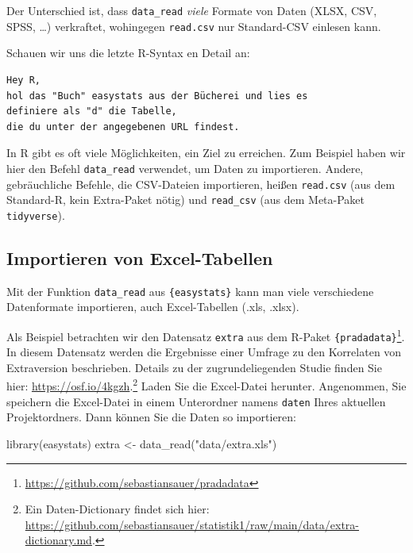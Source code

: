 \documentclass[
  letterpaper,
  oneside,
  open=any]{scrbook}
\newenvironment{Shaded}{\begin{snugshade}}{\end{snugshade}}
\newcommand{\FunctionTok}[1]{\textcolor[rgb]{0.28,0.35,0.67}{#1}}
\newcommand{\NormalTok}[1]{\textcolor[rgb]{0.00,0.23,0.31}{#1}}
\newcommand{\OtherTok}[1]{\textcolor[rgb]{0.00,0.23,0.31}{#1}}
\newcommand{\StringTok}[1]{\textcolor[rgb]{0.13,0.47,0.30}{#1}}
\theoremstyle{definition}
\theoremstyle{definition}
\theoremstyle{definition}
\theoremstyle{remark}
\begin{document}
Der Unterschied ist, dass \texttt{data\_read} \emph{viele} Formate von
Daten (XLSX, CSV, SPSS, \ldots) verkraftet, wohingegen \texttt{read.csv}
nur Standard-CSV einlesen kann.

Schauen wir uns die letzte R-Syntax en Detail an:

\begin{verbatim}
Hey R,
hol das "Buch" easystats aus der Bücherei und lies es
definiere als "d" die Tabelle,
die du unter der angegebenen URL findest.
\end{verbatim}

In R gibt es oft viele Möglichkeiten, ein Ziel zu erreichen. Zum
Beispiel haben wir hier den Befehl \texttt{data\_read} verwendet, um
Daten zu importieren. Andere, gebräuchliche Befehle, die CSV-Dateien
importieren, heißen \texttt{read.csv} (aus dem Standard-R, kein
Extra-Paket nötig) und \texttt{read\_csv} (aus dem Meta-Paket
\texttt{tidyverse}).

\subsection{Importieren von
Excel-Tabellen}\label{importieren-von-excel-tabellen}

Mit der Funktion \texttt{data\_read} aus \texttt{\{easystats\}} kann man
viele verschiedene Datenformate importieren, auch Excel-Tabellen (.xls,
.xlsx).

Als Beispiel betrachten wir den Datensatz \texttt{extra} aus dem R-Paket
\texttt{\{pradadata\}}\footnote{\url{https://github.com/sebastiansauer/pradadata}}.
In diesem Datensatz werden die Ergebnisse einer Umfrage zu den
Korrelaten von Extraversion beschrieben. Details zu der
zugrundeliegenden Studie finden Sie hier:
\url{https://osf.io/4kgzh}.\footnote{Ein Daten-Dictionary findet sich
  hier:
  \url{https://github.com/sebastiansauer/statistik1/raw/main/data/extra-dictionary.md}.}
Laden Sie die Excel-Datei herunter. Angenommen, Sie speichern die
Excel-Datei in einem Unterordner namens \texttt{daten} Ihres aktuellen
Projektordners. Dann können Sie die Daten so importieren:

\begin{Shaded}
\begin{Highlighting}[]
\FunctionTok{library}\NormalTok{(easystats)}
\NormalTok{extra }\OtherTok{\textless{}{-}} \FunctionTok{data\_read}\NormalTok{(}\StringTok{"data/extra.xls"}\NormalTok{)}
\end{Highlighting}
\end{Shaded}
\end{document}
